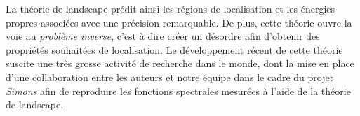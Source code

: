 La théorie de landscape prédit ainsi les régions de localisation et les énergies propres associées avec une précision remarquable. De plus, cette théorie ouvre la voie au \emph{problème inverse}, c'est à dire créer un désordre afin d'obtenir des propriétés souhaitées de localisation. Le développement récent de cette théorie suscite une très grosse activité de recherche dans le monde, dont la mise en place d'une collaboration entre les auteurs et notre équipe dans le cadre du projet \emph{Simons} afin de reproduire les fonctions spectrales mesurées à l'aide de la théorie de landscape.

